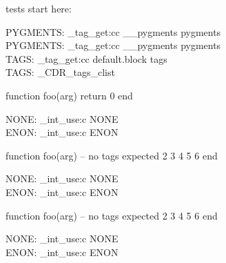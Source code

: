 
\ExplSyntaxOff
\makeatother

tests start here:


\ExplSyntaxOn
PYGMENTS: \CDR_tag_get:cc { __pygments } { pygments } \\
\ExplSyntaxOff
{}
\ExplSyntaxOn
PYGMENTS: \CDR_tag_get:cc { __pygments } { pygments } \\
TAGS: \CDR_tag_get:cc { default.block } { tags } \\
TAGS: \g_CDR_tags_clist \\
\ExplSyntaxOff
\begin{CDRBlock}[
  stepnumber=1,
]
function foo(arg) return 0 end
\end{CDRBlock}
\ExplSyntaxOn
NONE: \CDR_int_use:c { NONE } \\
ENON: \CDR_int_use:c { ENON } \\
\ExplSyntaxOff

\begin{CDRBlock}[
  stepnumber=1,
  firstnumber = last,
]
function foo(arg) -- no tags expected
  2
  3
  4
  5
  6
end
\end{CDRBlock}
\ExplSyntaxOn
NONE: \CDR_int_use:c { NONE } \\
ENON: \CDR_int_use:c { ENON } \\
\ExplSyntaxOff

\begin{CDRBlock}[
  stepnumber=1,
  firstnumber = auto,
]
function foo(arg) -- no tags expected
  2
  3
  4
  5
  6
end
\end{CDRBlock}
\ExplSyntaxOn
NONE: \CDR_int_use:c { NONE } \\
ENON: \CDR_int_use:c { ENON } \\
\ExplSyntaxOff

\egroup

